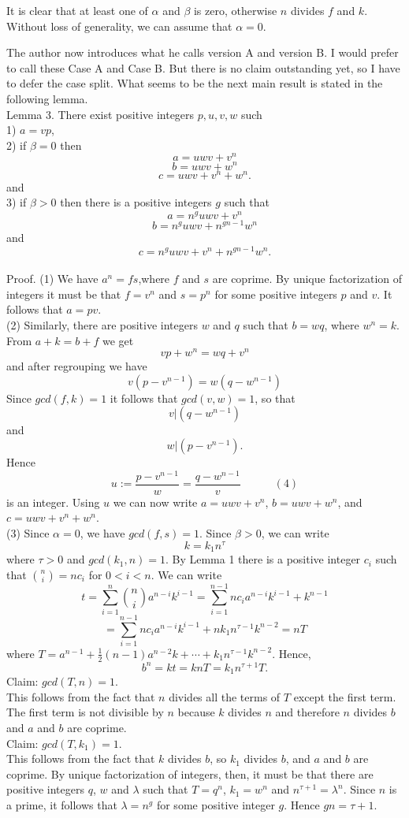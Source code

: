\documentclass[12pt]{article}
\begin{document}
It is clear that at least one of $\alpha$ and $\beta$ is zero, otherwise $n$ divides $f$
and $k$. Without loss of generality, we can assume that $\alpha=0$.

The author now introduces what he calls version A and version B. I would prefer to call these
Case A and Case B. But there is no claim outstanding yet, so I have to defer the case split.
What seems to be the next main result is stated in the following lemma. \\

Lemma 3. There exist positive integers $p,u,v,w$ such  \\
1) $a=vp$, \\
2) if $\beta = 0$ then  \\
$$
a = uwv + v^n 
$$
$$
b= uwv + w^n 
$$
$$
c = uwv + v^n + w^n.
$$ 
and \\
3) if $\beta > 0$ then there is a  positive integers $g$ such that
$$ 
a= n^guwv + v^ n
$$
$$
b= n^guwv + n^{gn-1}w^n
$$
and
$$
c= n^guwv + v^n + n^{gn-1}w^n.
$$ \\
Proof. (1) We have $a^n=fs$,where $f$ and $s$ are coprime. By unique factorization of integers
it must be that $f=v^n$ and $s=p^n$ for some positive integers $p$ and $v$. It follows that
$a=pv$. \\
(2) Similarly, there are positive integers $w$ and $q$ such that $b=wq$, where $w^n=k$.
From $a+k=b+f$ we get
$$
vp + w^n = wq + v^n
$$
and after regrouping we have
$$
v(p-v^{n-1}) = w(q-w^{n-1})
$$
Since $gcd(f,k)=1$ it follows that $gcd(v,w) = 1$, so that 
$$
v | (q-w^{n-1})
$$
and 
$$
w | (p-v^{n-1}). 
$$
Hence 
$$
u:= \frac{p-v^{n-1}}{w} = \frac{q-w^{n-1}}{v} \quad \quad \quad (4)
$$
is an integer. Using $u$ we can now write
$a=uwv+v^n$, $b=uwv+w^n$, and $c=uwv+v^n+w^n$.  \\
(3) Since  $\alpha=0$, we have  $gcd(f,s)=1$. 
Since $\beta>0$, we can write
$$
k = k_1 n^{\tau}
$$
where $\tau>0$ and $gcd(k_1, n) = 1$. By Lemma 1 there is a positive  integer $c_i$ such that
$\binom{n}{i} = nc_i$ for $0 < i < n$. We can write
$$
t = \sum_{i=1}^n \binom{n}{i}a^{n-i}k^{i-1} = \sum_{i=1}^{n-1}nc_i a^{n-i}k^{i-1} + k^{n-1} 
$$ 
$$
 = \sum_{i=1}^{n-1}nc_i a^{n-i}k^{i-1} + nk_1n^{\tau-1}k^{n-2} = nT
$$
where $T=a^{n-1} + \frac{1}{2}(n-1)a^{n-2}k + \cdots + k_1 n^{\tau-1}k^{n-2}$.
Hence,
$$
b^n = kt = knT = k_1n^{\tau+1}T.
$$
Claim: $gcd(T,n) = 1 $. \\
This follows from the fact that $n$ divides all the terms of $T$ except the first term.
The first term is not divisible by $n$ because $k$ divides $n$ and therefore $n$ divides $b$
and $a$ and $b$ are coprime. \\
Claim: $gcd(T,k_1) = 1$. \\
This follows from the fact that $k$ divides $b$, so $k_1$ divides $b$, and $a$ and
$b$ are coprime.
By unique factorization of integers, then, it must be that there are positive integers
$q$, $w$ and $\lambda$ such that
$T = q^n$, $k_1 = w^n$ and $n^{\tau+1} = \lambda^n$. Since $n$ is a prime, it follows
that $\lambda = n^g$ for some positive integer $g$. Hence $gn= \tau+1$. 
\end{document}
